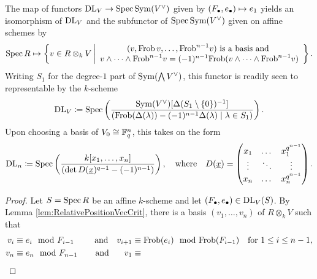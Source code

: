 \documentclass[../main.tex]{subfiles}
\begin{document}
\begin{prop}\label{prop:prop_YwExplicitely}
  The map of functors $\mathrm{DL}_V \to \operatorname{Spec} \operatorname{Sym}(V^\vee)$ given by 
  $(F_\bullet, e_\bullet) \mapsto e_1$ 
  yields an isomorphism of $\mathrm{DL}_V$ and the subfunctor of $\operatorname{Spec} \operatorname{Sym}(V^\vee)$ given on
  affine schemes by
  \begin{equation*}
    \spec R \mapsto \left\{v \in R \otimes_k V \, \bigg \vert
      \begin{array}c 
        (v, \Frob\, v, \dots, \Frob^{n-1} v) \text{ is a basis and } \\ 
        v \wedge \dots \wedge \Frob^{n-1} v = (-1)^{n-1} \Frob( v \wedge \dots
        \wedge \Frob^{n-1}v) 
      \end{array}\right\}.
  \end{equation*}
  Writing $S_1$ for the degree-$1$ part of $\operatorname{Sym}(\bigwedge V^\vee)$,
  this functor is readily seen to representable by the $k$-scheme
  \begin{equation*}
    \mathrm{DL}_V \coloneq \operatorname{Spec} \left( \frac{\operatorname{Sym}(V^\vee)[\Delta(S_1 \setminus\{0\})^{-1}]}
    {(\mathrm{Frob} (\Delta(\lambda)) - (-1)^{n-1} \Delta(\lambda) \mid \lambda \in S_1)} \right).
  \end{equation*}
  Upon choosing a basis of $V_0 \cong \mathbb{F}_q^n$, this takes on the form
  \begin{equation*}
    \mathrm{DL}_n \coloneq \operatorname{Spec} \left(\frac{k[x_1, \dots, x_n]}{\left(
        \det D(\underline x)^{q-1} - (-1)^{n-1}\right)} \right), \quad
        \text{where} \quad D(\underline x) = 
          \begin{pmatrix}
            x_1 & \dots & x_1^{q^{n-1}}\\
            \vdots & \ddots  & \vdots \\
            x_n & \dots & x_n^{q^{n-1}}
          \end{pmatrix}.
  \end{equation*}
\begin{proof}
  Let $S = \operatorname{Spec} R$ be an affine $k$-scheme and let $(F_\bullet, e_\bullet) \in \mathrm{DL}_V(S)$. 
  By Lemma \ref{lem:RelativePositionVecCrit}, there is a basis 
  $(v_1, \dots, v_n)$ of $R \otimes_k V$ such that 
  \begin{equation}\label{eq:conditionsonvecs}
    \begin{aligned}
      v_i &\equiv e_i \mod F_{i-1} \quad &\text{and} \quad v_{i+1} &\equiv
      \Frob(e_i) \mod \Frob(F_{i-1}) \quad \text{for } 1 \leq i \leq n-1,\\ 
      v_n &\equiv e_n \mod F_{n-1} \quad &\text{and}\hspace{0.8em}\quad  v_1 &\equiv

\end{aligned}
\end{equation}
\end{proof}
\end{prop}
\end{document}
